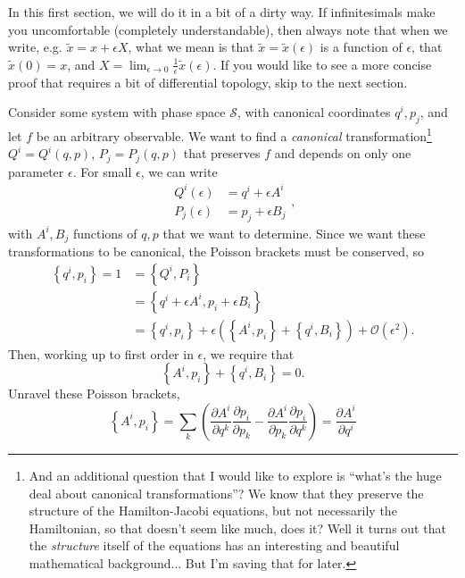\documentclass[11pt,a4]{article}
\newcommand{\pdev}[2]{\frac{\partial #1}{\partial #2}}
\newcommand{\set}[1]{\left\{#1\right\}}
\begin{document}
In this first section, we will do it in a bit of a dirty way. If infinitesimals make you uncomfortable (completely understandable), then
always note that when we write, e.g. $\tilde{x} = x + \epsilon X$, what we mean is that $\tilde{x}=\tilde{x}(\epsilon)$ is a function of $\epsilon$, that $\tilde{x}(0)=x$, and $X = \lim_{\epsilon\to 0}\frac{1}{\epsilon}\tilde{x}(\epsilon)$. If you would like to see a more concise proof that requires a bit of differential topology, skip to the next section.

Consider some system with phase space $\mathcal{S}$, with canonical coordinates $q^i,p_j$, and let $f$ be an arbitrary observable. We want to find a \emph{canonical} transformation\footnote{And an additional question that I would like to explore is ``what's the huge deal about canonical transformations''? We know that they preserve the structure of the Hamilton-Jacobi equations, but not necessarily the Hamiltonian, so that doesn't seem like much, does it? Well it turns out that the \emph{structure} itself of the equations has an interesting and beautiful mathematical background... But I'm saving that for later. }
$Q^i = Q^i(q,p)$, $P_j = P_j(q,p)$ that preserves $f$ and depends on only one parameter $\epsilon$. For small $\epsilon$, we can write
\begin{equation}
  \begin{aligned}
    Q^i(\epsilon) &= q^i + \epsilon A^i\\
    P_j(\epsilon) &= p_j + \epsilon B_j
  \end{aligned},
\end{equation}
with $A^i,B_j$ functions of $q,p$ that we want to determine. Since we want these transformations to be canonical, the Poisson brackets must be conserved, so
\begin{equation}
  \begin{aligned}
    \set{q^i,p_i} = 1 &= \set{Q^i,P_i} \\
    &= \set{q^i + \epsilon A^i,p_i + \epsilon B_i}\\
    &= \set{q^i,p_i} + \epsilon\left(\set{A^i,p_i}+\set{q^i,B_i}\right) + \mathcal{O}(\epsilon^2).
  \end{aligned}
\end{equation}
Then, working up to first order in $\epsilon$, we require that
\begin{equation}
  \set{A^i,p_i}+\set{q^i,B_i} = 0.
\end{equation}
Unravel these Poisson brackets,
\begin{equation}
  \set{A^i,p_i} = \sum_k\left(\pdev{A^i}{q^k}\pdev{p_i}{p_k} - \pdev{A^i}{p_k}\pdev{p_i}{q^k}\right) = \pdev{A^i}{q^i}
\end{equation}
\end{document}
